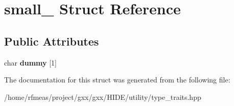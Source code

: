 \hypertarget{structsmall__}{}\section{small\+\_\+ Struct Reference}
\label{structsmall__}
\subsection*{Public Attributes}
\begin{DoxyCompactItemize}
\item 
char {\bfseries dummy} \mbox{[}1\mbox{]}\hypertarget{structsmall___a09ea7a1e320789cd402634f713f8a013}{}\label{structsmall___a09ea7a1e320789cd402634f713f8a013}

\end{DoxyCompactItemize}


The documentation for this struct was generated from the following file\+:\begin{DoxyCompactItemize}
\item 
/home/rfmeas/project/gxx/gxx/\+H\+I\+D\+E/utility/type\+\_\+traits.\+hpp\end{DoxyCompactItemize}
